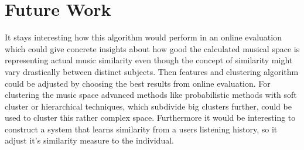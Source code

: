 \documentclass[cic,tc,english]{iiufrgs}
\begin{document}
\section{Future Work}
It stays interesting how this algorithm would perform in an online evaluation which could give concrete insights about how good the calculated musical space is representing actual music similarity even though the concept of similarity might vary drastically between distinct subjects. Then features and clustering algorithm could be adjusted by choosing the best results from online evaluation. For clustering the music space advanced methods like probabilistic methods with soft cluster or hierarchical techniques, which subdivide big clusters further, could be used to cluster this rather complex space. Furthermore it would be interesting to construct a system that learns similarity from a users listening history, so it adjust it's similarity measure to the individual.



\end{document}
